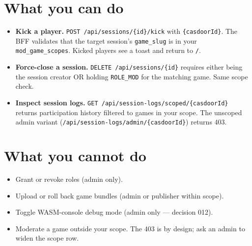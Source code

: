 \documentclass[11pt,a4paper,openany]{book}
\begin{document}
\chapter{What you can do}
\begin{itemize}
  \item \textbf{Kick a player.} \texttt{POST /api/sessions/\{id\}/kick}
        with \texttt{\{casdoorId\}}. The BFF validates that the target
        session's \texttt{game\_slug} is in your
        \texttt{mod\_game\_scopes}. Kicked players see a toast and
        return to \texttt{/}.
  \item \textbf{Force-close a session.}
        \texttt{DELETE /api/sessions/\{id\}} requires either being the
        session creator OR holding \texttt{ROLE\_MOD} for the matching
        game. Same scope check.
  \item \textbf{Inspect session logs.}
        \texttt{GET /api/session-logs/scoped/\{casdoorId\}} returns
        participation history filtered to games in your scope. The
        unscoped admin variant
        (\texttt{/api/session-logs/admin/\{casdoorId\}}) returns 403.
\end{itemize}

\chapter{What you cannot do}
\begin{itemize}
  \item Grant or revoke roles (admin only).
  \item Upload or roll back game bundles (admin or publisher within
        scope).
  \item Toggle WASM-console debug mode (admin only --- decision 012).
  \item Moderate a game outside your scope. The 403 is by design; ask
        an admin to widen the scope row.
\end{itemize}
\end{document}
